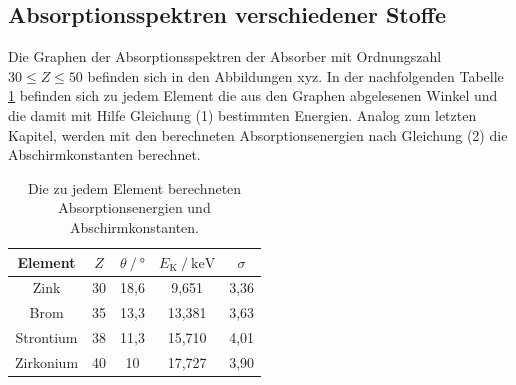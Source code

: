 \subsection{Absorptionsspektren verschiedener Stoffe}
Die Graphen der Absorptionsspektren der Absorber 
mit Ordnungszahl $30 \leq Z \leq 50$ befinden sich in den Abbildungen xyz.
In der nachfolgenden Tabelle \ref{tab:energie2} befinden sich zu jedem Element die aus den Graphen abgelesenen Winkel
und die damit mit Hilfe Gleichung (1) bestimmten Energien.
Analog zum letzten Kapitel, werden mit den berechneten Absorptionsenergien nach Gleichung (2) die Abschirmkonstanten berechnet.

\begin{table}[H]
  \centering
  \caption{Die zu jedem Element berechneten Absorptionsenergien und Abschirmkonstanten.}
  \label{tab:energie2}
\begin{tabular}{c c c c c}
  \toprule
Element & $Z$ & $\theta \:/\: °$ & $E_\text{K}\:/\: \si{\kilo\electronvolt}$ & $\sigma$\\
\midrule
Zink & 30 & 18,6 & 9,651 & 3,36\\
Brom & 35 & 13,3 & 13,381  & 3,63\\
Strontium & 38 & 11,3 & 15,710 & 4,01\\
Zirkonium & 40 & 10 & 17,727 & 3,90\\
\bottomrule
\end{tabular}
\end{table}

